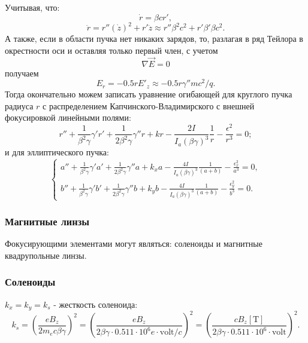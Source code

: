 \documentclass[11pt]{article}
\begin{document}
    Учитывая, что: \[
\dot r = \beta c r',
\] \[
\ddot r = r'' (\dot z)^2 + r'\ddot z \approx r'' \beta^2 c^2 + r' \beta' \beta c^2.
\] А также, если в области пучка нет никаких зарядов, то, разлагая в ряд
Тейлора в окрестности оси и оставляя только первый член, с учетом
\[\nabla \vec{E} = 0\] получаем \[
E_r = -0.5 r E'_z \approx - 0.5 r \gamma'' mc^2/q.
\] Тогда окончательно можем записать уравнение огибающей для круглого
пучка радиуса \(r\) с распределением Капчинского-Владимирского с внешней
фокусировкой линейными полями: \[
\displaystyle r'' + \frac{1}{\beta^2\gamma} \gamma' r' + \frac{1}{2\beta^2\gamma}\gamma''r + kr - \frac{2I}{I_a (\beta\gamma)^3}\frac{1}{r} - \frac{\epsilon^2}{r^3} = 0 ;
\] и для эллиптического пучка: \[
\begin{equation*}
 \begin{cases}
   \displaystyle a'' + \frac{1}{\beta^2\gamma} \gamma' a' + \frac{1}{2\beta^2\gamma}\gamma''a + k_xa - \frac{4I}{I_a (\beta\gamma)^3}\frac{1}{(a+b)} - \frac{\epsilon_x^2}{a^3} = 0 ,
   \\
   \displaystyle b'' + \frac{1}{\beta^2\gamma} \gamma' b' + \frac{1}{2\beta^2\gamma}\gamma''b + k_yb - \frac{4I}{I_a (\beta\gamma)^3}\frac{1}{(a+b)} - \frac{\epsilon_y^2}{b^3} = 0.
 \end{cases}
\end{equation*}
\]

    \hypertarget{ux43cux430ux433ux43dux438ux442ux43dux44bux435-ux43bux438ux43dux437ux44b}{%
\subsubsection{Магнитные
линзы}\label{ux43cux430ux433ux43dux438ux442ux43dux44bux435-ux43bux438ux43dux437ux44b}}

Фокусирующими элементами могут являться: соленоиды и магнитные
квадрупольные линзы.

\hypertarget{ux441ux43eux43bux435ux43dux43eux438ux434ux44b}{%
\subsubsection{Соленоиды}\label{ux441ux43eux43bux435ux43dux43eux438ux434ux44b}}

\(k_x = k_y = k_s\) - жесткость соленоида: \[
k_s = \left ( \frac{eB_z}{2m_ec\beta\gamma} \right )^2 = \left ( \frac{e B_z}{2\beta\gamma\cdot 0.511\cdot 10^6 e \cdot \mathrm{volt}/c} \right )^2 =
\left ( \frac{cB_z[\mathrm{T}]}{2\beta\gamma\cdot 0.511\cdot 10^6 \cdot \mathrm{volt}} \right )^2.
\]
\end{document}
